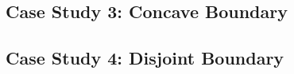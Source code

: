 

\subsection{Case Study 3: Concave Boundary}\label{sec:res-optonly}



\subsection{Case Study 4: Disjoint Boundary}\label{sec:res-cmbnd}





